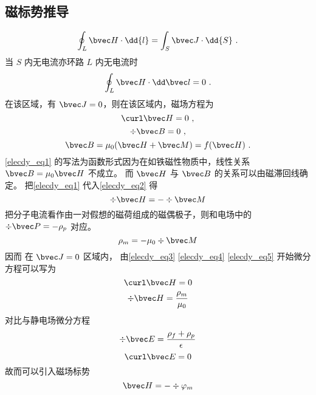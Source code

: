
\subsection{磁标势推导}
\begin{equation}
\oint_L \bvec H \cdot \dd{l} = \int_S \bvec J \cdot \dd{S}~.
\end{equation}
当 $S$ 内无电流亦环路 $L$ 内无电流时
\begin{equation}
\oint_ L\bvec H \cdot \dd \bvec l = 0~.
\end{equation}
在该区域，有 $\bvec J=0$，则在该区域内，磁场方程为 
\begin{equation}\label{elecdy_eq3}
\curl \bvec H =0~,
\end{equation}
\begin{equation}\label{elecdy_eq2}
\div \bvec B=0~,
\end{equation}
\begin{equation}\label{elecdy_eq1}
\bvec B=\mu_0(\bvec H+\bvec M)=f(\bvec H)~.
\end{equation}
\autoref{elecdy_eq1} 的写法为函数形式因为在如铁磁性物质中，线性关系 $\bvec B=\mu_0 \bvec H$ 不成立。
而 $\bvec H$ 与 $\bvec B$ 的关系可以由磁滞回线确定。
把\autoref{elecdy_eq1} 代入\autoref{elecdy_eq2} 得
\begin{equation}\label{elecdy_eq4}
\div \bvec H= - \div \bvec M
\end{equation}
把分子电流看作由一对假想的磁荷组成的磁偶极子，则和电场中的 $\div \bvec P=-\rho _p$ 对应。
\begin{equation}\label{elecdy_eq5}
\rho_m=-\mu_0 \div \bvec M
\end{equation}
因而 在 $\bvec J=0$ 区域内， 由\autoref{elecdy_eq3} \autoref{elecdy_eq4} \autoref{elecdy_eq5} 开始微分方程可以写为
\begin{equation}
\curl \bvec H=0 
\end{equation}
\begin{equation}
\div \bvec H= \dfrac{\rho_m}{\mu_0}
\end{equation}
对比与静电场微分方程
\begin{equation}
\div \bvec E=\dfrac{\rho_f+\rho_p}{\epsilon}
\end{equation}
\begin{equation}
\curl \bvec E=0
\end{equation}
故而可以引入磁场标势
\begin{equation}
\bvec H=-\div \varphi_m
\end{equation}
